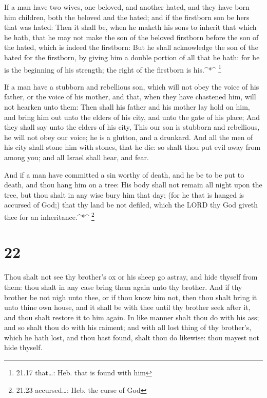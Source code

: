  If a man have two wives, one beloved, and another hated,
and they have born him children, both the beloved and the hated; and if
the firstborn son be hers that was hated:  Then it shall
be, when he maketh his sons to inherit that which he hath, that he may
not make the son of the beloved firstborn before the son of the hated,
which is indeed the firstborn:  But he shall acknowledge
the son of the hated for the firstborn, by giving him a double portion
of all that he hath: for he is the beginning of his strength; the right
of the firstborn is his.\^{}*\^{} \footnote{21.17 that\ldots: Heb. that
  is found with him}

 If a man have a stubborn and rebellious son, which will
not obey the voice of his father, or the voice of his mother, and that,
when they have chastened him, will not hearken unto them: 
Then shall his father and his mother lay hold on him, and bring him out
unto the elders of his city, and unto the gate of his place;
 And they shall say unto the elders of his city, This our
son is stubborn and rebellious, he will not obey our voice; he is a
glutton, and a drunkard.  And all the men of his city shall
stone him with stones, that he die: so shalt thou put evil away from
among you; and all Israel shall hear, and fear.

 And if a man have committed a sin worthy of death, and he
be to be put to death, and thou hang him on a tree:  His
body shall not remain all night upon the tree, but thou shalt in any
wise bury him that day; (for he that is hanged is accursed of God;) that
thy land be not defiled, which the LORD thy God giveth thee for an
inheritance.\^{}*\^{} \footnote{21.23 accursed\ldots: Heb. the curse of
  God}

\hypertarget{section-21}{%
\section{22}\label{section-21}}

 Thou shalt not see thy brother's ox or his sheep go astray,
and hide thyself from them: thou shalt in any case bring them again unto
thy brother.  And if thy brother be not nigh unto thee, or
if thou know him not, then thou shalt bring it unto thine own house, and
it shall be with thee until thy brother seek after it, and thou shalt
restore it to him again.  In like manner shalt thou do with
his ass; and so shalt thou do with his raiment; and with all lost thing
of thy brother's, which he hath lost, and thou hast found, shalt thou do
likewise: thou mayest not hide thyself.

